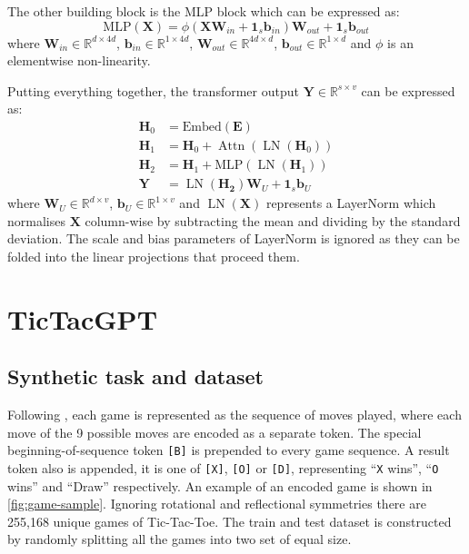 \documentclass{article}
\newcommand{\ttgpt}{TicTacGPT\xspace}
\newcommand{\ttt}{Tic-Tac-Toe\xspace}
\renewcommand{\v}[1]{\mathbf{\bm{#1}}}
\newcommand{\m}[1]{\mathbf{\bm{#1}}}
\newcommand{\R}{\mathbb{R}}
\DeclareMathOperator{\layernorm}{LN}
\DeclareMathOperator{\attn}{Attn}
\begin{document}
The other building block is the MLP block which can be expressed as:
\begin{equation*}
    \text{MLP}(\m{X}) = \phi(
    \m{X} \m{W}_{in} + \v{1}_s \m{b}_{in}
    ) \m{W}_{out} + \v{1}_s \m{b}_{out}
\end{equation*}
where $\m{W}_{in} \in \R^{d \times 4d}$, $\v{b}_{in} \in \R^{1 \times 4d}$, $\m{W}_{out} \in \R^{4d \times d}$, $\v{b}_{out} \in \R^{1 \times d}$ and $\phi$ is an elementwise non-linearity.

Putting everything together, the transformer output $\m{Y} \in \R^{s \times v}$ can be expressed as:
\begin{equation}  \label{eq:transformer}
    \begin{aligned}
        \m{H}_0 & = \text{Embed}(\m{E})                           \\
        \m{H}_1 & = \m{H}_0 + \attn(\layernorm(\m{H}_0))          \\
        \m{H}_2 & = \m{H}_1 + \text{MLP}(\layernorm(\m{H}_1))     \\
        \m{Y}   & = \layernorm(\m{H_2}) \m{W}_U + \v{1}_s \v{b}_U
    \end{aligned}
\end{equation}
where $\m{W}_U \in \R^{d \times v}$, $\v{b}_U \in \R ^{1 \times v}$ and $\layernorm(\m{X})$ represents a LayerNorm which normalises $\m{X}$ column-wise by subtracting the mean and dividing by the standard deviation. The scale and bias parameters of LayerNorm is ignored as they can be folded into the linear projections that proceed them.

\section{\ttgpt}

\subsection{Synthetic task and dataset}



Following \cite{orthello-gpt}, each game is represented as the sequence of moves played, where each move of the 9 possible moves are encoded as a separate token. The special beginning-of-sequence token \texttt{[B]} is prepended to every game sequence. A result token also is appended, it is one of \texttt{[X]}, \texttt{[O]} or \texttt{[D]}, representing ``\texttt{X} wins'', ``\texttt{O} wins'' and ``Draw'' respectively. An example of an encoded game is shown in \cref{fig:game-sample}. Ignoring rotational and reflectional symmetries there are 255,168 unique games of \ttt. The train and test dataset is constructed by randomly splitting all the games into two set of equal size.
\end{document}

